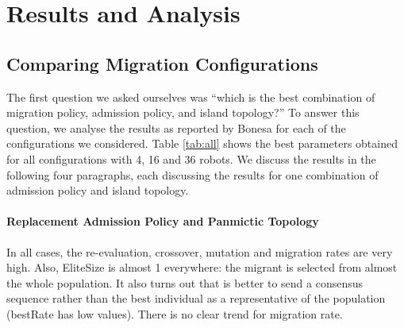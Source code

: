 \documentclass[runningheads]{llncs}
\begin{document}

\section{Results and Analysis}
\label{sec:results}

\subsection{Comparing Migration Configurations}
The first question we asked ourselves was ``which is the best combination of migration policy, admission policy, and island topology?'' To answer this question, we analyse the results as reported by Bonesa for each of the configurations we considered. Table \ref{tab:all} shows the best parameters obtained for all configurations with 4, 16 and 36 robots.  We discuss the results in the following four paragraphs, each discussing the results for one combination of admission policy and island topology.

\paragraph{Replacement Admission Policy and Panmictic Topology}

In all cases, the re-evaluation, crossover, mutation and migration rates are very high. Also, EliteSize is almost 1 everywhere: the migrant is selected from almost the whole population. It also turns out that is better to send a consensus sequence rather than the best individual as a representative of the population (bestRate has low values). 
There is no clear trend for migration rate.
\end{document}
